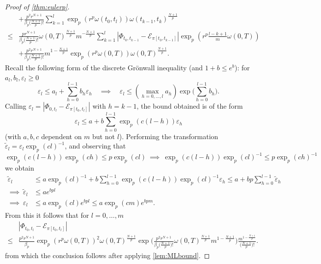 \documentclass{article}
\numberwithin{equation}{section}
\theoremstyle{definition}
\theoremstyle{remark}
\begin{document}
\begin{proof}[Proof of \autoref{thm:eulerp}]
\begin{align*}
&+ \frac{p^2 r^{N+1}}{\beta_p\big(\frac{N+1}{p}\big)!} \sum_{k = 1}^l \exp_p(r^p \omega(t_0,t_l)) \omega(t_{k-1},t_k)^{\frac{N+1}{p}} \\
\leq{} &\frac{p r^{N+1}}{\beta_p\big(\frac{N+1}{p}\big)!} \omega(0,T)^{\frac{N+1}{p}} m^{-\frac{N+1}{p}} \sum_{k = 1}^l |\Phi_{t_0,t_{k-1}} - \mathcal E_{\pi[t_0,t_{k-1}]}| \exp_p(r^p \tfrac{l-k+1}{m} \omega(0,T))  \\
&+ \frac{p^2 r^{N+1} }{\beta_p\big(\frac{N+1}{p}\big)!} m^{1-\frac{N+1}{p}} \exp_p(r^p \omega(0,T)) \omega(0,T)^{\frac{N+1}{p}}.
\end{align*}
Recall the following form of the discrete Gr\"onwall inequality \cite{clark87} (and $1+b \leq e^b$): for $a_l,b_l,\varepsilon_l \geq 0$
\begin{equation}\label{eq:discgron}
\varepsilon_l \leq a_l + \sum_{h = 0}^{l-1} b_h \varepsilon_h \quad \implies \quad \varepsilon_l \leq (\max_{h = 0,\ldots,l} a_h) \exp\Big(\sum_{h = 0}^{l-1} b_h \Big) . 
\end{equation}
Calling $\varepsilon_l = |\Phi_{0,t_l} - \mathcal E_{\pi[t_0,t_l]}|$ with $h = k-1$, the bound obtained is of the form
\[
\varepsilon_l \leq a + b\sum_{h = 0}^{l-1} \exp_p(c (l - h)) \varepsilon_h
\]
(with $a,b,c$ dependent on $m$ but not $l$). Performing the transformation $\widetilde \varepsilon_l = \varepsilon_l \exp_p(cl)^{-1}$, and observing that
\[
\exp_p(c(l - h)) \exp_p(ch) \leq p \exp_p(cl) \ \implies \ \exp_p(c(l - h)) \exp_p(cl)^{-1} \leq p \exp_p(ch)^{-1} 
\]
we obtain
\begin{align*}
\widetilde \varepsilon_l &\leq a \exp_p(cl)^{-1} + b\sum_{h = 0}^{l-1} \exp_p(c (l - h))\exp_p(cl)^{-1} \varepsilon_h \leq a + bp\sum_{h = 0}^{l-1} \widetilde\varepsilon_h \\
\implies \ \widetilde\varepsilon_l &\leq a e^{bpl}\\
\implies \ \varepsilon_l &\leq a \exp_p(cl) e^{bpl} \leq a \exp_p(cm) e^{bpm} .
\end{align*}
From this it follows that for $l = 0,\ldots, m$
\begin{align*}
&|\Phi_{t_0,t_l} - \mathcal E_{\pi[t_0,t_l]}|\\
\leq{}& \frac{p^2 r^{N+1}}{\beta_p} \exp_p(r^p \omega(0,T))^2 \omega(0,T)^{\frac{N+1}{p}} \exp\bigg( \frac{p^2 r^{N+1}}{\beta_p\big(\frac{N+1}{p}\big)!} \omega(0,T)^{\frac{N+1}{p}} m^{1-\frac{N+1}{p}} \bigg) \frac{m^{1-\frac{N+1}{p}}}{\big(\frac{N+1}{p}\big)!} .
\end{align*}
from which the conclusion follows after applying \autoref{lem:MLbound}.
\end{proof}
\end{document}
